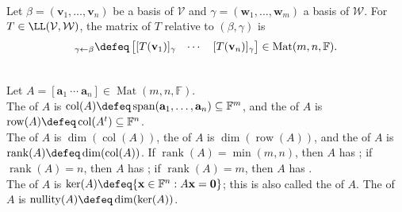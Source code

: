 \begin{definition} \\
Let $\beta = (\mathbf{v}_1, \ldots, \mathbf{v}_n)$ be a basis of $\mathcal{V}$ and $\gamma = (\mathbf{w}_1, \ldots, \mathbf{w}_m)$ a basis of $\mathcal{W}$. For $T \in \LL(\mathcal{V}, \mathcal{W})$, the matrix of $T$ relative to $(\beta,\gamma)$ is
\begin{align}
[T]_{\gamma \leftarrow \beta} \defeq
\begin{bmatrix}
[T(\mathbf{v}_1)]_{\gamma} & \cdots & [T(\mathbf{v}_n)]_{\gamma}
\end{bmatrix}
\in \operatorname{Mat}(m,n,\mathbb{F}). \nonumber
\end{align}
\end{definition}

\begin{definition} \\
Let $A=[\mathbf{a}_1\ \cdots\ \mathbf{a}_n]\in\operatorname{Mat}(m,n,\mathbb{F})$.\\
The  of $A$ is $\operatorname{col}(A)\defeq\operatorname{span}(\mathbf{a}_1,\ldots,\mathbf{a}_n)\subseteq\mathbb{F}^m$, and the  of $A$ is $\operatorname{row}(A)\defeq\operatorname{col}(A^t)\subseteq\mathbb{F}^n$.\\
The  of $A$ is $\dim(\operatorname{col}(A))$, the  of $A$ is $\dim(\operatorname{row}(A))$, and the  of $A$ is $\operatorname{rank}(A)\defeq\dim(\operatorname{col}(A))$. If $\operatorname{rank}(A)=\min(m,n)$, then $A$ has ; if $\operatorname{rank}(A)=n$, then $A$ has ; if $\operatorname{rank}(A)=m$, then $A$ has .\\
The  of $A$ is $\ker(A)\defeq\{\mathbf{x}\in\mathbb{F}^n:A\mathbf{x}=\mathbf{0}\}$; this is also called the  of $A$. The  of $A$ is $\operatorname{nullity}(A)\defeq\dim(\ker(A))$.
\end{definition}

